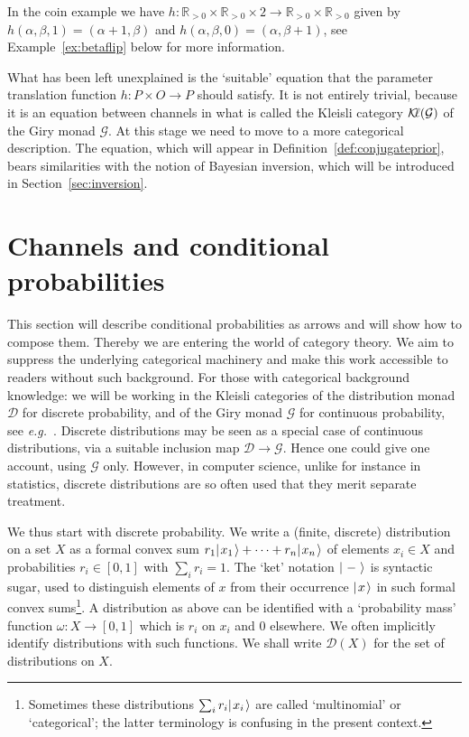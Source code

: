 \documentclass{mscs}
\newcommand{\Dst}{\mathcal{D}}
\newcommand{\Giry}{\mathcal{G}}
\newcommand{\R}{\mathbb{R}}
\newcommand{\ket}[1]{\ensuremath{|{\kern.1em}#1{\kern.1em}\rangle}}
\newcommand{\Kl}{\mathcal{K}{\kern-.5ex}\ell}
\begin{document}
In the coin example we have $h\colon \R_{>0}\times\R_{>0} \times 2
\rightarrow \R_{>0}\times\R_{>0}$ given by $h(\alpha,\beta,1) =
(\alpha+1,\beta)$ and $h(\alpha,\beta,0) = (\alpha,\beta+1)$, see
Example~\ref{ex:betaflip} below for more information.

What has been left unexplained is the `suitable' equation that the
parameter translation function $h\colon P\times O \rightarrow P$
should satisfy. It is not entirely trivial, because it is an equation
between channels in what is called the Kleisli category $\Kl(\Giry)$
of the Giry monad $\Giry$. At this stage we need to move to a more
categorical description.  The equation, which will appear in
Definition~\ref{def:conjugateprior}, bears similarities with the
notion of Bayesian inversion, which will be introduced in
Section~\ref{sec:inversion}.



\section{Channels and conditional probabilities}\label{sec:Kleisli}

This section will describe conditional probabilities as arrows and
will show how to compose them. Thereby we are entering the world of
category theory. We aim to suppress the underlying categorical
machinery and make this work accessible to readers without such
background. For those with categorical background knowledge: we will
be working in the Kleisli categories of the distribution monad $\Dst$
for discrete probability, and of the Giry monad $\Giry$ for continuous
probability, see \textit{e.g.}~\cite{Giry82,Panangaden09,Jacobs17a}.
Discrete distributions may be seen as a special case of continuous
distributions, via a suitable inclusion map $\Dst \rightarrow \Giry$.
Hence one could give one account, using $\Giry$ only. However, in
computer science, unlike for instance in statistics, discrete
distributions are so often used that they merit separate treatment.

We thus start with discrete probability. We write a (finite, discrete)
distribution on a set $X$ as a formal convex sum $r_{1}\ket{x_1} +
\cdots + r_{n}\ket{x_n}$ of elements $x_{i}\in X$ and probabilities
$r_{i}\in [0,1]$ with $\sum_{i}r_{i}=1$. The `ket' notation $\ket{-}$
is syntactic sugar, used to distinguish elements of $x$ from their
occurrence $\ket{x}$ in such formal convex sums\footnote{Sometimes
  these distributions $\sum_{i}r_{i}\ket{x_i}$ are called
  `multinomial' or `categorical'; the latter terminology is confusing
  in the present context.}. A distribution as above can be identified
with a `probability mass' function $\omega \colon X \rightarrow [0,1]$
which is $r_{i}$ on $x_{i}$ and $0$ elsewhere. We often implicitly
identify distributions with such functions. We shall write $\Dst(X)$
for the set of distributions on $X$.
\end{document}
